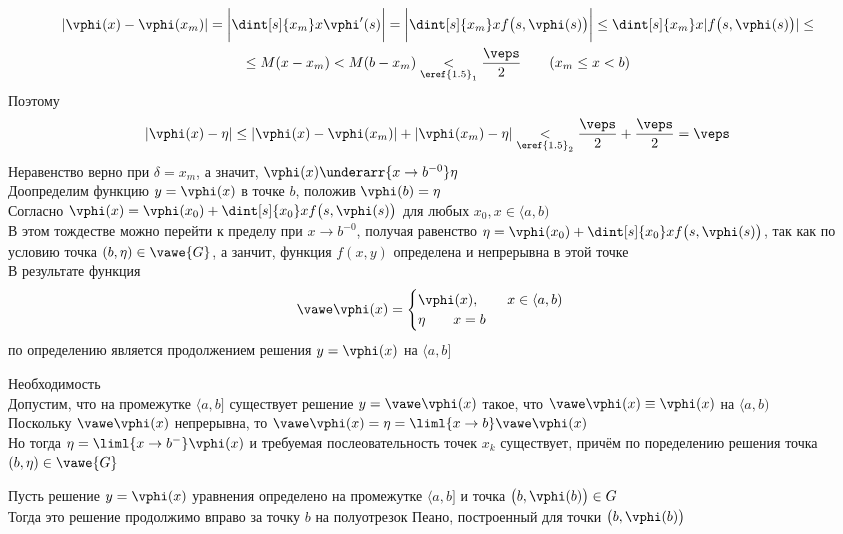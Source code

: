 \begin{iproof}
\begin{multline*}
        |\vphi(x) - \vphi(x_m)| = \bigg| \dint[s]{x_m}x{\vphi'(s)}\bigg| = \bigg| \dint[s]{x_m}x{f \big( s, \vphi(s) \big)}\bigg| \le \dint[s]{x_m}x{|f \big( s, \vphi(s) \big)|} \le \\
        \le M(x - x_m) < M(b - x_m) \underset{\eref{1.5}_1}< \frac\veps2 \qquad (x_m \le x < b)
    \end{multline*}
    Поэтому
    $$ |\vphi(x) - \eta| \le |\vphi(x) - \vphi(x_m)| + |\vphi(x_m) - \eta| \underset{\eref{1.5}_2}< \frac\veps2 + \frac\veps2 = \veps $$
    Неравенство  верно при $ \delta = x_m $, а значит, $ \vphi(x) \underarr{x \to b^{-0}} \eta $ \\
    Доопределим функцию $ y = \vphi(x) $ в точке $ b $, положив $ \vphi(b) = \eta $ \\
    Согласно  $ \vphi(x) = \vphi(x_0) + \dint[s]{x_0}x{f \big(s, \vphi(s) \big)} $ для любых $ x_0, x \in \langle a, b) $ \\
    В этом тождестве можно перейти к пределу при $ x \to b^{-0} $, получая равенство $ \eta = \vphi(x_0) + \dint[s]{x_0}x{f \big( s, \vphi(s) \big)} $, так как по условию точка $ (b, \eta) \in \vawe{G} $, а занчит, функция $ f(x, y) $ определена и непрерывна в этой точке \\
    В результате функция
    $$ \vawe\vphi(x) =
    \begin{cases}
    	\vphi(x), \qquad x \in \langle a, b) \\
        \eta \qquad x = b
    \end{cases} $$
    по определению является продолжением решения $ y = \vphi(x) $ на $ \langle a, b] $
    \item Необходимость \\
    Допустим, что на промежутке $ \langle a, b] $ существует решение $ y = \vawe\vphi(x) $ такое, что $ \vawe\vphi(x) \equiv \vphi(x) $ на $ \langle a, b) $ \\
    Поскольку $ \vawe\vphi(x) $ непрерывна, то $ \vawe\vphi(x) = \eta = \liml{x \to b}\vawe\vphi(x) $ \\
    Но тогда $ \eta = \liml{x \to b^-}\vphi(x) $ и требуемая послеовательность точек $ x_k $ существует, причём по поределению решения точка $ (b, \eta) \in \vawe{G} $
\end{iproof}

\begin{lemma}
    Пусть решение $ y = \vphi(x) $ уравнения  определено на промежутке $ \langle a, b] $ и точка $ \big( b, \vphi(b) \big) \in G $ \\
    Тогда это решение продолжимо вправо за точку $ b $ на полуотрезок Пеано, построенный для точки $ \big( b, \vphi(b) \big) $
\end{lemma}

